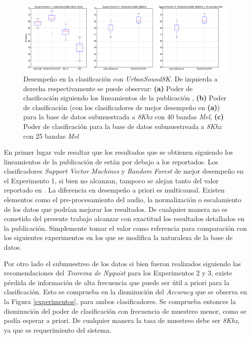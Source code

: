 \documentclass{article}
\begin{document}
\begin{figure}[h]
\begin{center}
\includegraphics[width=1\textwidth]{boxplots} 
\caption{Desempeño en la clasificación con \textit{UrbanSound8K}. De izquierda a derecha respectivamente se puede observar: \textbf{(a)} Poder de clasificación siguiendo los lineamientos de la publicación \citep{Salamon:UrbanSound:ACMMM:14}, \textbf{(b)} Poder de clasificación (con los clasificadores de mejor desempeño en \textbf{(a)}) para la base de datos submuestrada a \textit{8Khz} con 40 bandas \textit{Mel}, \textbf{(c)} Poder de clasificación para la base de datos submuestreada a \textit{8Khz} con 25 bandas \textit{Mel}}
\label{fig:boxplots}
\end{center}
\end{figure}

En primer lugar vale resaltar que los resultados que se obtienen siguiendo los lineamientos de la publicación de \citep{Salamon:UrbanSound:ACMMM:14} están por debajo a los reportados. Los clasificadores \textit{Support Vector Machines} y \textit{Random Forest} de mejor desempeño en el Experimento 1, si bien no alcanzan, tampoco se alejan tanto del valor reportado en \cite{Salamon:UrbanSound:ACMMM:14}. La diferencia en desempeño a priori es multicausal. Existen elementos como el pre-procesamiento del audio, la normalización o escalamiento de los datos que podrían mejorar los resultados. De cualquier manera no es cometido del presente trabajo alcanzar con exactitud los resultados detallados en la publicación. Simplemente tomar el valor como referencia para comparación con los siguientes experimentos en los que se modifica la naturaleza de la base de datos.

\bigskip
Por otro lado el submuestreo de los datos si bien fueron realizados siguiendo las recomendaciones del \textit{Teorema de Nyquist} para los Experimentos 2 y 3, existe pérdida de información de alta frecuencia que puede ser útil a priori para la clasificación. Esto se comprueba en la disminución del \textit{Accuracy} que se observa en la Figura \ref{experimentos}, para ambos clasificadores. Se comprueba entonces la disminución del poder de clasificación con frecuencia de muestreo menor, como se podía esperar a priori. De cualquier manera la tasa de muestreo debe ser \textit{8Khz}, ya que es requerimiento del sistema.  
\end{document}
